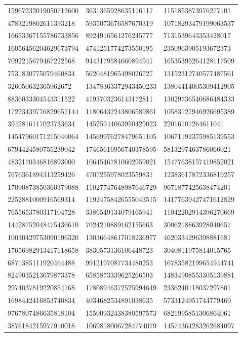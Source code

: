 \begin{longtable}{*{3}{l}}
15967232019050712600&3631365928635116117&1151853873976277101\\
4783219802611393218&5935073676587670319&10718293479199063537\\
16653367155786733856&8924916561276245777&7131539643353428017\\
16056456204629673794&4741251774273550195&2350963905193672373\\
7092215679467222568&9443179584660894941&16535395264128117509\\
7531830775079460834&5620481965498026727&13152312740577487561\\
326050632365962672&13478363372943450233&13804414005309412905\\
8836033304543311522&4193703236143172811&13029736540686484333\\
17223439776829657144&11806432243806589861&10583127946926695389\\
3942816117023733634&14525944063950429023&22016107264611041\\
14547960171215040064&14569976278479651105&10671192375985139553\\
6794424580755239042&17465616956740378595&5813297463786066021\\
4832170346816893000&10645467810602959021&15477638157419852021\\
7676361894313259426&4707255978023559831&12383617872336819257\\
17090873850360379088&11027747648987646729&9671877425638474201\\
2252881000916569314&11924758426555043515&14177639427471612829\\
7655653780317104728&3386549134079165941&11042202914396270669\\
14428752048475436610&7024210889162155663&3006218863928040657\\
10030429753090196320&13036648617018236977&4620334296398881681\\
17656982913417118658&3830573136106448723&3040811975814015765\\
6871385111920464488&9912197087734480253&16783582199654944741\\
8249035213679873378&6585873339625266503&14834908553305139881\\
2974037819220854768&17808946372525994649&2336240118037297801\\
1698442416853740834&4034682534891038635&5733124951744779469\\
9767807486635818104&15500932438380597573&6821995851306864061\\
3876184215977910018&10698180067284774079&14574364283262684097\\

\end{longtable}
